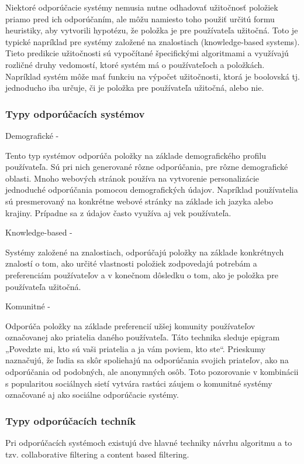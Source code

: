 Niektoré odporúčacie systémy nemusia nutne odhadovať užitočnosť položiek priamo pred ich odporúčaním, ale môžu namiesto toho použiť určitú formu heuristiky, aby vytvorili hypotézu, že položka je pre používateľa užitočná. Toto je typické napríklad pre systémy založené na znalostiach (knowledge-based systems). Tieto predikcie užitočnosti sú vypočítané špecifickými algoritmami a využívajú rozličné druhy vedomostí, ktoré systém má o používateľoch a položkách. Napríklad systém môže mať funkciu na výpočet užitočnosti, ktorá je boolovská tj. jednoducho iba určuje, či je položka pre používateľa užitočná, alebo nie. \\

\subsubsection{Typy odporúčacích systémov}
\begin{itemize}[leftmargin=*]
{\bf \item Demografické - }Tento typ systémov odporúča položky na základe demografického profilu používateľa. Sú pri nich generované rôzne odporúčania, pre rôzne demografické oblasti. Mnoho webových stránok používa na vytvorenie personalizácie jednoduché odporúčania pomocou demografických údajov. Napríklad používatelia sú presmerovaný na konkrétne webové stránky na základe ich jazyka alebo krajiny. Prípadne sa z údajov často využíva aj vek používateľa.
{\bf \item Knowledge-based - }Systémy založené na znalostiach, odporúčajú položky na základe konkrétnych znalostí o tom, ako určité vlastnosti položiek zodpovedajú potrebám a preferenciám používateľov a v konečnom dôsledku o tom, ako je položka pre používateľa užitočná.
{\bf \item Komunitné - }Odporúča položky na základe preferencií užšej komunity používateľov označovanej ako priatelia daného používateľa. Táto technika sleduje epigram „Povedzte mi, kto sú vaši priatelia a ja vám poviem, kto ste“. Prieskumy naznačujú, že ľudia sa skôr spoliehajú na odporúčania svojich priateľov, ako na odporúčania
od podobných, ale anonymných osôb. Toto pozorovanie v kombinácii s popularitou sociálnych sietí vytvára rastúci záujem o komunitné systémy označované aj ako sociálne odporúčacie systémy. \\
\end{itemize} 
 
\subsubsection{Typy odporúčacích techník}
Pri odporúčacích systémoch existujú dve hlavné techniky návrhu algoritmu a to tzv. collaborative filtering a content based filtering. \\

